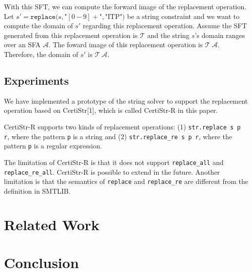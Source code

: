 \documentclass[a4paper,UKenglish,cleveref, autoref, thm-restate]{lipics-v2021}
\begin{document}
  With this SFT, we can compute the forward image of the replacement operation.
  Let $s' = \texttt{replace}(s, $"$[0-9]+$"$, $"$\text{ITP}$"$)$ be a string constraint and we want to compute the domain of $s'$ regarding this replacement operation.
  Assume the SFT generated from this replacement operation is $\mathcal{T}$ and the string $s$'s domain ranges over an SFA $\mathcal{A}$. The foward image of this replacement operation is $\mathcal{T}~\mathcal{A}$. Therefore, the domain of $s'$ is $\mathcal{T}~\mathcal{A}$.





\subsection{Experiments}

We have implemented a prototype of the string solver to support the replacement operation based on CertiStr[1], which is called CertiStr-R in this paper. 

CertiStr-R supports two kinds of replacement operations: (1) \texttt{str.replace s p r}, where the pattern \texttt{p} is a string and (2) \texttt{str.replace\_re s p r}, where the pattern \texttt{p} is a regular expression. 


The limitation of CertiStr-R is that it does not support \texttt{replace\_all} and \texttt{replace\_re\_all}. CertiStr-R is possible to extend in the future. Another limitation is that the semantics of \texttt{replace} and \texttt{replace\_re} are different from the definition in SMTLIB.

\section{Related Work}

\section{Conclusion}
\end{document}

